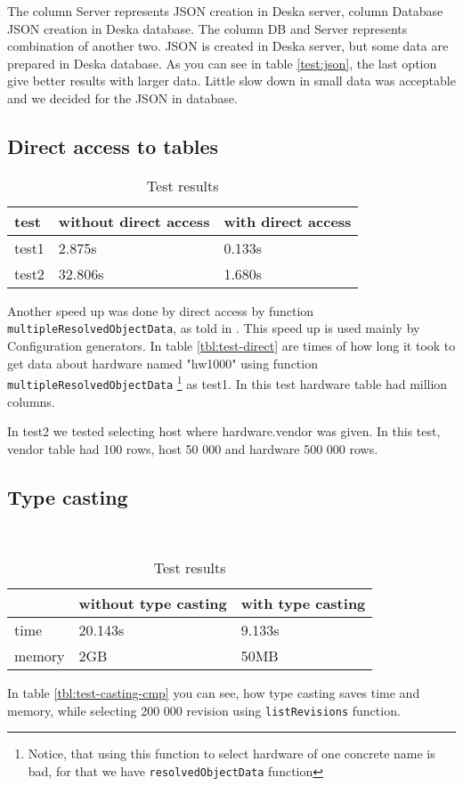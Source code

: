 \documentclass[deska]{subfiles}
\begin{document}
The column Server represents JSON creation in Deska server, column Database JSON creation in
Deska database. The column DB and Server represents combination of another two. JSON is created
in Deska server, but some data are prepared in Deska database.
As you can see in table \ref{test:json}, the last option give better results with larger data.
Little slow down in small data was acceptable and we decided for the JSON in database.

\subsection{Direct access to tables}
\label{sec:test-direct}


\label{tbl:test-direct}
\begin{longtable}{ l | l | l }
\caption{Test results}\\
test & without direct access & with direct access \\
\hline
\endhead
test1 & 2.875s & 0.133s \\
test2 & 32.806s & 1.680s \\
\end{longtable}

Another speed up was done by direct access by function {\tt multipleResolvedObjectData}, as told in .
This speed up is used mainly by Configuration generators.
In table \ref{tbl:test-direct} are times of how long it took to get data about hardware named "hw1000" using function {\tt multipleResolvedObjectData}
\footnote{Notice, that using this function to select hardware of one concrete name is bad, for that we have
{\tt resolvedObjectData} function}
as test1. In this test hardware table had million columns.

In test2 we tested selecting host where hardware.vendor was given. In this test, vendor table
had 100 rows, host 50 000 and hardware 500 000 rows.

\subsection{Type casting}
\label{sec:test-cast}

\label{tbl:test-casting-cmp}\\
\begin{longtable}{ l | l | l }
\caption{Test results}\\
& without type casting & with type casting \\
\hline
\endhead
time & 20.143s & 9.133s \\
memory & 2GB & 50MB \\
\end{longtable}

In table \ref{tbl:test-casting-cmp} you can see, how type casting saves time and memory,
while selecting 200 000 revision using {\tt listRevisions} function.
\end{document}
